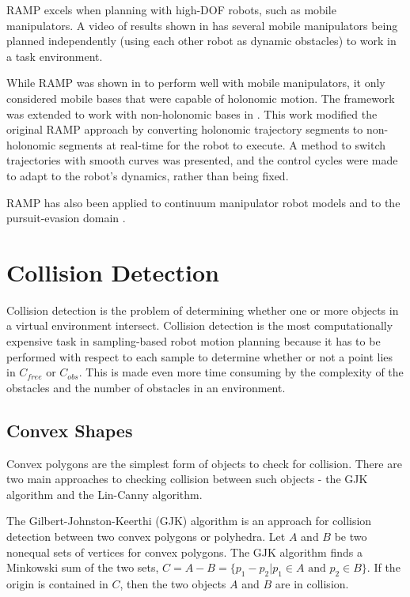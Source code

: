 \documentclass[10pt,conference]{ieeeconf}
\begin{document}
RAMP excels when planning with high-DOF robots, such as mobile manipulators. A video of results shown in \cite{RAMP} has several mobile manipulators being planned independently (using each other robot as dynamic obstacles) to work in a task environment.

While RAMP was shown in \cite{RAMP} to perform well with mobile manipulators, it only considered mobile bases that were capable of holonomic motion. The framework was extended to work with non-holonomic bases in \cite{mcleod2016real}. This work modified the original RAMP approach by converting holonomic trajectory segments to non-holonomic segments at real-time for the robot to execute. A method to switch trajectories with smooth curves was presented, and the control cycles were made to adapt to the robot's dynamics, rather than being fixed.

RAMP has also been applied to continuum manipulator robot models \cite{xiao2010real} and to the pursuit-evasion domain \cite{annas2009intelligent}.



\section{Collision Detection} \label{sec:coll}
	
	Collision detection is the problem of determining whether one or more objects in a virtual environment intersect. Collision detection is the most computationally expensive task in sampling-based robot motion planning because it has to be performed with respect to each sample to determine whether or not a point lies in $C_{free}$ or $C_{obs}$. This is made even more time consuming by the complexity of the obstacles and the number of obstacles in an environment.
	
\subsection{Convex Shapes}
	
	Convex polygons are the simplest form of objects to check for collision. There are two main approaches to checking collision between such objects - the GJK algorithm and the Lin-Canny algorithm.
	
	The Gilbert-Johnston-Keerthi (GJK) algorithm \cite{gilbert1988fast} is an approach for collision detection between two convex polygons or polyhedra. Let $A$ and $B$ be two nonequal sets of vertices for convex polygons. The GJK algorithm finds a Minkowski sum of the two sets, $C = A - B = \{p_1 - p_2 | p_1 \in A \text{ and } p_2 \in B\}$. If the origin is contained in $C$, then the two objects $A$ and $B$ are in collision.
	
\end{document}

